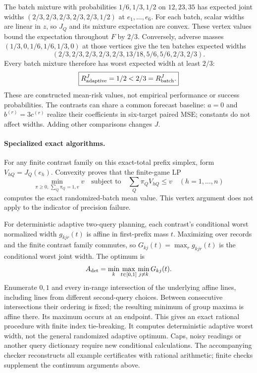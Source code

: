 The batch mixture with probabilities $1/6,1/3,1/2$ on $12,23,35$ has expected
joint widths $(2/3,2/3,2/3,2/3,2/3,1/2)$ at $e_1,\ldots,e_6$.
For each batch, scalar widths are linear in $z$, so $J_Q$ and its mixture
expectation are convex. These vertex values bound the expectation throughout
$F$ by $2/3$. Conversely, adverse masses $(1/3,0,1/6,1/6,1/3,0)$ at those
vertices give the ten batches expected widths
\[
 (2/3,2/3,2/3,2/3,2/3,13/18,5/6,5/6,2/3,2/3).
\]
Every batch mixture therefore has worst expected width at least $2/3$:
\[
 \boxed{R_{\rm adaptive}^{J}=1/2<2/3=R_{\rm batch}^{J}.}
\]
These are constructed mean-risk values, not empirical performance or
success probabilities. The contrasts can share a common forecast baseline:
$a=0$ and $b^{(r)}=3c^{(r)}$ realize their coefficients in six-target paired
MSE; constants do not affect widths. Adding other comparisons changes $J$.

\paragraph{Specialized exact algorithms.}
For any finite contrast family on this exact-total prefix simplex, form
$V_{hQ}=J_Q(e_h)$. Convexity proves that the finite-game LP
\[
 \min_{\pi\geq0,\,\sum_Q\pi_Q=1,v}v
 \quad\text{subject to}\quad\sum_Q\pi_QV_{hQ}\leq v\quad(h=1,\ldots,n)
\]
computes the exact randomized-batch mean value. This vertex argument does
not apply to the indicator of precision failure.

For deterministic adaptive two-query planning, each contrast's conditional
worst normalized width $g_{kjr}(t)$ is affine in first-prefix mass $t$.
Maximizing over records and the finite contrast family commutes, so
$G_{kj}(t)=\max_r g_{kjr}(t)$ is the conditional worst joint width. The optimum is
\[
 A_{\rm det}=\min_k\max_{t\in[0,1]}\min_{j\ne k}G_{kj}(t).
\]
Enumerate $0,1$ and every in-range intersection of the underlying affine
lines, including lines from different second-query choices. Between
consecutive intersections their ordering is fixed; the resulting
minimum of group maxima is affine there. Its maximum occurs at an endpoint.
This gives an exact rational procedure with finite index tie-breaking.
It computes deterministic adaptive worst width, not the general randomized
adaptive optimum. Caps, noisy readings or another query dictionary require
new conditional calculations. The accompanying checker reconstructs all
example certificates with rational arithmetic; finite checks supplement
the continuum arguments above.

